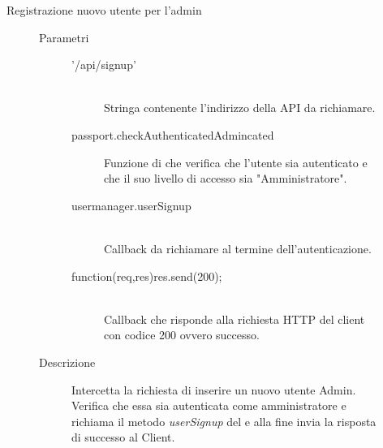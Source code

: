 \begin{description}
\begin{description}
\begin{mldescription}
 \end{mldescription} 
 
 \item[Registrazione nuovo utente per l'admin]
 \begin{mldescription}
  \begin{description}
     \item[Parametri] \hfill
      \begin{description}
       \item['/api/signup'] \hfill \\
       Stringa contenente l'indirizzo della API da richiamare.
       \item[passport.checkAuthenticatedAdmincated]
       Funzione di  che verifica che l'utente sia autenticato e che il suo livello di accesso sia "Amministratore".
       \item[usermanager.userSignup] \hfill \\
       Callback da richiamare al termine dell'autenticazione.
       \item[function(req,res){res.send(200);}] \hfill \\
       Callback che risponde alla richiesta HTTP del client con codice 200 ovvero successo.
      \end{description}
     \item[Descrizione]
     Intercetta la richiesta di inserire un nuovo utente Admin. Verifica che essa sia autenticata come amministratore e richiama il metodo \textit{userSignup} del  e alla fine invia la risposta di successo al Client.
  \end{description}
 \end{mldescription}
  

\end{description}
\end{description}
